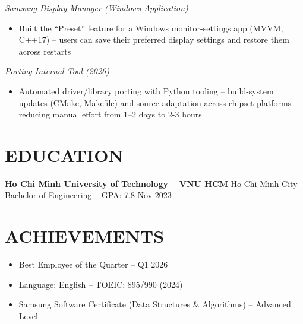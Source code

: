 \documentclass[a4paper,10pt]{article}
\newcommand{\project}[1]{\vspace{2pt}\textit{#1}\vspace{1pt}}
\begin{document}
\project{Samsung Display Manager (Windows Application)}
\begin{itemize}
    \item Built the ``Preset'' feature for a Windows monitor-settings app (MVVM, C++17) --
          users can save their preferred display settings and restore them across restarts
\end{itemize}

\project{Porting Internal Tool (2026)}
\begin{itemize}
    \item Automated driver/library porting with Python tooling -- build-system updates
          (CMake, Makefile) and source adaptation across chipset platforms --
          reducing manual effort from 1--2 days to 2-3 hours
\end{itemize}

\section*{EDUCATION}
\textbf{Ho Chi Minh University of Technology -- VNU HCM} \hfill Ho Chi Minh City \\
Bachelor of Engineering -- GPA: 7.8 \hfill Nov 2023

\section*{ACHIEVEMENTS}
\begin{itemize}
    \item Best Employee of the Quarter -- Q1 2026
    \item Language: English -- TOEIC: 895/990 (2024)
    \item Samsung Software Certificate (Data Structures \& Algorithms) -- Advanced Level
\end{itemize}
\end{document}

